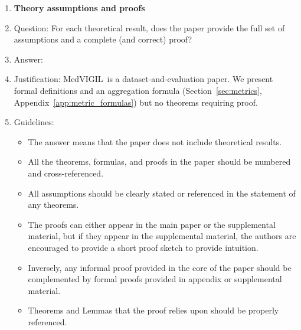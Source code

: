 \documentclass{article}
\newcommand{\medvigil}{MedVIGIL}
\begin{document}
\begin{enumerate}
\begin{itemize}
        \item The authors should discuss the computational efficiency of the proposed algorithms and how they scale with dataset size.
        \item If applicable, the authors should discuss possible limitations of their approach to address problems of privacy and fairness.
        \item While the authors might fear that complete honesty about limitations might be used by reviewers as grounds for rejection, a worse outcome might be that reviewers discover limitations that aren't acknowledged in the paper. The authors should use their best judgment and recognize that individual actions in favor of transparency play an important role in developing norms that preserve the integrity of the community. Reviewers will be specifically instructed to not penalize honesty concerning limitations.
    \end{itemize}

\item {\bf Theory assumptions and proofs}
    \item[] Question: For each theoretical result, does the paper provide the full set of assumptions and a complete (and correct) proof?
    \item[] Answer: \answerNA{}
    \item[] Justification: \medvigil\ is a dataset-and-evaluation paper. We present formal definitions and an aggregation formula (Section~\ref{sec:metrics}, Appendix~\ref{app:metric_formulas}) but no theorems requiring proof.
    \item[] Guidelines:
    \begin{itemize}
        \item The answer \answerNA{} means that the paper does not include theoretical results.
        \item All the theorems, formulas, and proofs in the paper should be numbered and cross-referenced.
        \item All assumptions should be clearly stated or referenced in the statement of any theorems.
        \item The proofs can either appear in the main paper or the supplemental material, but if they appear in the supplemental material, the authors are encouraged to provide a short proof sketch to provide intuition.
        \item Inversely, any informal proof provided in the core of the paper should be complemented by formal proofs provided in appendix or supplemental material.
        \item Theorems and Lemmas that the proof relies upon should be properly referenced.
    \end{itemize}


\end{enumerate}
\end{document}

